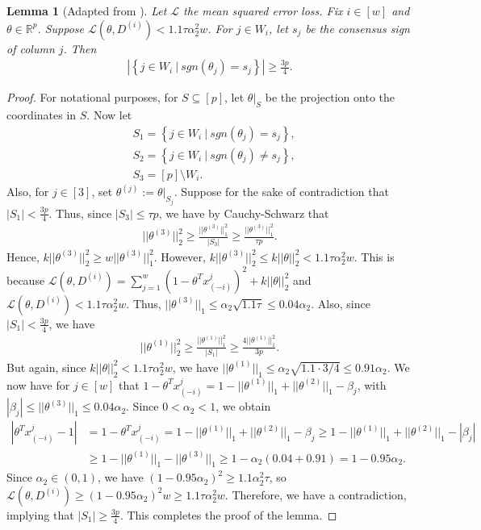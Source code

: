 \documentclass{article}
\newtheorem{lemma}{Lemma}
\begin{document}
\begin{lemma}[Adapted from \cite{NOPL}]
\label{lemma:ERM_Dist_Free_LB_Helper}
Let $\mathcal{L}$ the mean squared error loss. Fix $i \in [w]$ and $\theta \in \mathbb{R}^p$. Suppose $\mathcal{L}\left(\theta, D^{(i)}\right) < 1.1 \tau \alpha_2^2 w$. For $j \in W_i$, let $s_j$ be the consensus sign of column $j$. Then
\begin{align*}
\left|\left\{j \in W_i \ | \ sgn(\theta_j) = s_j\right\}\right| \geq \frac{3p}{4}.
\end{align*}
\end{lemma}
\begin{proof}
For notational purposes, for $S \subseteq [p]$, let $\theta |_{S}$ be the projection onto the coordinates in $S$. Now let
\begin{align*}
&S_1 = \left\{j \in W_i \ | \ sgn(\theta_j) = s_j\right\},\\
&S_2 = \left\{j \in W_i \ | \ sgn(\theta_j) \neq s_j\right\},\\ 
&S_3 = [p] \setminus W_i.
\end{align*}
Also, for $j \in [3]$, set $\theta^{(j)} := \theta |_{S_j}$. Suppose for the sake of contradiction that $|S_1| < \frac{3p}{4}$. Thus, since $|S_3| \leq \tau p$, we have by Cauchy-Schwarz that
\begin{align*}
||\theta^{(3)}||_2^2 \geq \frac{||\theta^{(3)}||_1^2}{|S_3|} \geq \frac{||\theta^{(3)}||_1^2}{\tau p}.
\end{align*}
Hence, $k||\theta^{(3)}||_2^2 \geq w||\theta^{(3)}||_1^2$. However, $k||\theta^{(3)}||_2^2 \leq k||\theta||_2^2 < 1.1 \tau \alpha_2^2 w$. This is because $\mathcal{L}\left(\theta, D^{(i)}\right) = \sum_{j = 1}^w \left(1 - \theta^Tx_{(-i)}^{j}\right)^2 + k||\theta||_2^2$ and $\mathcal{L}\left(\theta, D^{(i)}\right) < 1.1 \tau \alpha_2^2 w$. Thus, $||\theta^{(3)}||_1 \leq \alpha_2 \sqrt{1.1 \tau} \leq 0.04\alpha_2$. Also, since $|S_1| < \frac{3p}{4}$, we have
\begin{align*}
||\theta^{(1)}||_2^2 \geq \frac{||\theta^{(1)}||_1^2}{|S_1|} \geq \frac{4||\theta^{(1)}||_1^2}{3p}.
\end{align*}
But again, since $k||\theta||_2^2 < 1.1 \tau \alpha_2^2 w$, we have $||\theta^{(1)}||_1 \leq \alpha_2\sqrt{1.1\cdot 3/4} \leq 0.91\alpha_2$. We now have for $j \in [w]$ that $1 - \theta^Tx_{(-i)}^j = 1 -||\theta^{(1)}||_1 + ||\theta^{(2)}||_1 - \beta_j$, with $|\beta_j| \leq ||\theta^{(3)}||_1 \leq 0.04\alpha_2$. Since $0 < \alpha_2 < 1$, we obtain
\begin{align*}
\left|\theta^Tx_{(-i)}^j - 1\right| &= 1 - \theta^Tx_{(-i)}^j = 1 - ||\theta^{(1)}||_1 + ||\theta^{(2)}||_1 - \beta_j \geq 1 - ||\theta^{(1)}||_1 + ||\theta^{(2)}||_1 - |\beta_j|\\
&\geq 1 - ||\theta^{(1)}||_1 - ||\theta^{(3)}||_1 \geq 1 - \alpha_2(0.04 + 0.91) = 1 - 0.95\alpha_2.
\end{align*}
Since $\alpha_2 \in (0, 1)$, we have $(1 - 0.95\alpha_2)^2 \geq 1.1\alpha_2^2\tau$, so $\mathcal{L}\left(\theta, D^{(i)}\right) \geq (1 - 0.95\alpha_2)^2w \geq 1.1\tau\alpha_2^2w$. Therefore, we have a contradiction, implying that $|S_1| \geq \frac{3p}{4}$. This completes the proof of the lemma.
\end{proof}
\end{document}
